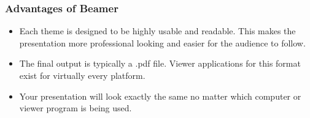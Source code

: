 \documentclass[aspectratio=169,utf8]{ctexbeamer}
\begin{document}
\begin{frame}
  \frametitle{Advantages of Beamer}

  \begin{itemize}
    \item Each theme is designed to be highly usable and readable. This makes the presentation more professional looking and easier for the audience to follow.
    \item The final output is typically a \alert{.pdf} file. Viewer applications for this format exist for virtually every platform.
    \item \alert{Your presentation will look exactly the same no matter which computer or viewer program is being used.}
  \end{itemize}
  
\end{frame}
\end{document}
